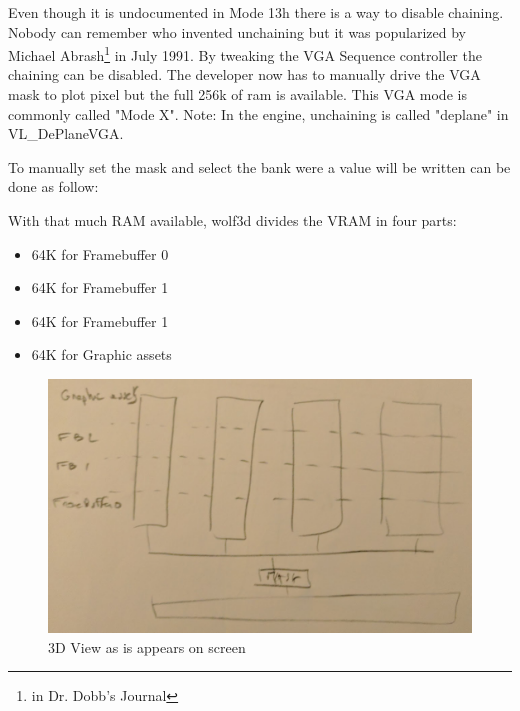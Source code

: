 \documentclass[book.tex]{subfiles}
\begin{document}
 \par
 Even though it is undocumented in Mode 13h there is a way to disable chaining. Nobody can remember who invented unchaining but it was popularized by Michael Abrash\footnote{in Dr. Dobb's Journal} in July 1991. By tweaking the VGA Sequence controller the chaining can be disabled. The developer now has to manually drive the VGA mask to plot pixel but the full 256k of ram is available. This VGA mode is commonly called "Mode X". Note: In the engine, unchaining is called "deplane" in VL\_DePlaneVGA.\\
 \par
 \begin{minipage}{\textwidth}

\end{minipage}
 \par
 To manually set the mask and select the bank were a value will be written can be done as follow:\\
 \par
 \begin{minipage}{\textwidth}

\end{minipage}
 \par
 With that much RAM available, wolf3d divides the VRAM in four parts:
 \begin{itemize}
 \item 64K for Framebuffer 0
 \item 64K for Framebuffer 1
 \item 64K for Framebuffer 1
 \item 64K for Graphic assets
\end{itemize}
\par
\begin{figure}[H]
\centering
 \includegraphics[width=\textwidth]{imgs/vga_layout/vga_ram_architecture.png}
 \caption{3D View as is appears on screen} \label{fig:vga_layout_in_3D}
 \end{figure}
\end{document}
